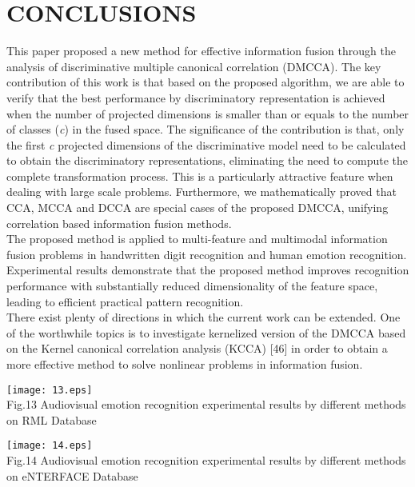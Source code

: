 \documentclass[journal]{IEEEtran}
\begin{document}
\section{CONCLUSIONS}
This paper proposed a new method for effective information fusion through the analysis of discriminative multiple canonical correlation (DMCCA). The key contribution of this work is that based on the proposed algorithm, we are able to verify that the best performance by discriminatory representation is achieved when the number of projected dimensions is smaller than or equals to the number of classes (\emph{c}) in the fused space. The significance of the contribution is that, only the first \emph{c} projected dimensions of the discriminative model need to be calculated to obtain the discriminatory representations, eliminating the need to compute the complete transformation process. This is a particularly attractive feature when dealing with large scale problems. Furthermore, we mathematically proved that CCA, MCCA and DCCA are special cases of the proposed DMCCA, unifying correlation based information fusion methods.\\\indent The proposed method is applied to multi-feature and multimodal information fusion problems in handwritten digit recognition and human emotion recognition. Experimental results demonstrate that the proposed method improves recognition performance with substantially reduced dimensionality of the feature space, leading to efficient practical pattern recognition.\\\indent There exist plenty of directions in which the current work can be extended. One of the worthwhile topics is to investigate kernelized version of the DMCCA based on the Kernel canonical correlation analysis (KCCA) [46] in order to obtain a more effective method to solve nonlinear problems in information fusion.

\begin{figure*}[t]
\centering
\texttt{[image: 13.eps]}\\ Fig.13 Audiovisual emotion recognition experimental results by different methods on RML Database\\
\end{figure*}

\begin{figure*}[t]
\centering
\texttt{[image: 14.eps]}\\ Fig.14 Audiovisual emotion recognition experimental results by different methods on eNTERFACE Database\\
\end{figure*}
\end{document}
